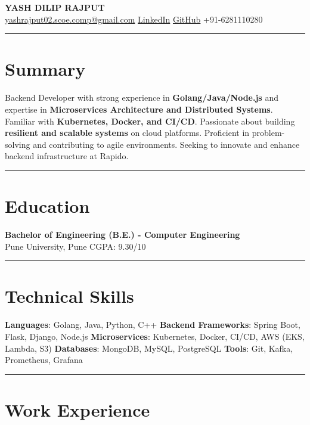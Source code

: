 \documentclass[a4paper,10pt]{article}
\begin{document}
\begin{center}
    {\LARGE \textbf{YASH DILIP RAJPUT}}\\
    \href{mailto:yashrajput02.scoe.comp@gmail.com}{yashrajput02.scoe.comp@gmail.com} \textbar
    \href{https://www.linkedin.com/in/yashrajput7232}{LinkedIn} \textbar
    \href{https://github.com/yash7232}{GitHub} \textbar
    +91-6281110280
\end{center}

\hrule
\vspace{3pt}
\section*{Summary}
Backend Developer with strong experience in \textbf{Golang/Java/Node.js} and expertise in \textbf{Microservices Architecture and Distributed Systems}. Familiar with \textbf{Kubernetes, Docker, and CI/CD}. Passionate about building \textbf{resilient and scalable systems} on cloud platforms. Proficient in problem-solving and contributing to agile environments. Seeking to innovate and enhance backend infrastructure at Rapido.

\vspace{3pt}
\hrule
\vspace{3pt}

\section*{Education}
\textbf{Bachelor of Engineering (B.E.) - Computer Engineering}\\
Pune University, Pune \hfill CGPA: 9.30/10
\vspace{3pt}
\hrule
\vspace{3pt}

\section*{Technical Skills}
\textbf{Languages}: Golang, Java, Python, C++ \textbar \space
\textbf{Backend Frameworks}: Spring Boot, Flask, Django, Node.js \textbar \space
\textbf{Microservices}: Kubernetes, Docker, CI/CD, AWS (EKS, Lambda, S3) \textbar \space
\textbf{Databases}: MongoDB, MySQL, PostgreSQL \textbar \space
\textbf{Tools}: Git, Kafka, Prometheus, Grafana
\vspace{3pt}

\hrule
\vspace{3pt}

\section*{Work Experience}
\end{document}
